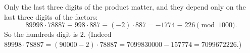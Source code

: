 Only the last three digits of the product matter, and they depend only on the last three digits of the factors:
\[89998\cdot78887\equiv998\cdot887\equiv(-2)\cdot887=-1774\equiv226\pmod{1000}.\]
So the hundreds digit is $\boxed{2}$. (Indeed $89998\cdot78887=(90000-2)\cdot78887=7099830000-157774=7099672226$.)
